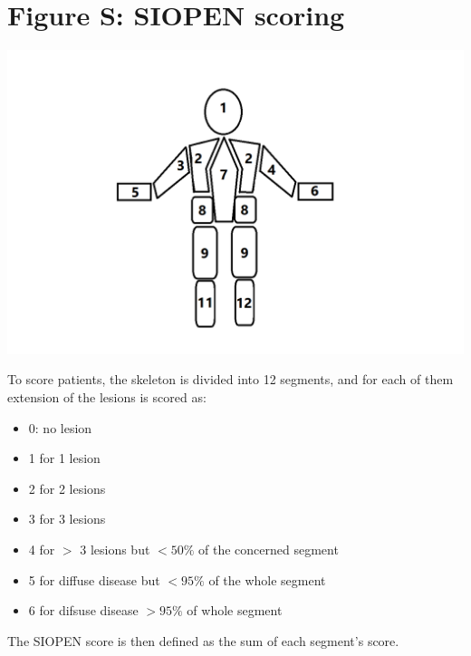 \documentclass[11pt]{article}
\newcounter{fignb}  %
\begin{document}
\section{Figure S: SIOPEN scoring}
\spaceV
\begin{center}
\includegraphics[width=1\textwidth]{figure_S2}
\end{center}
To score patients, the skeleton is divided into 12 segments, and for each of them extension of the lesions is scored as:
\begin{itemize}
\item 0: no lesion
\item 1 for 1 lesion
\item 2 for 2 lesions
\item 3 for 3 lesions
\item 4 for $>$ 3 lesions but $< 50\%$ of the concerned segment
\item 5 for diffuse disease but $<95\%$ of the whole segment
\item 6 for difsuse disease $>95\%$ of  whole segment
\end{itemize}
The SIOPEN score is then defined as the sum of each segment's score.
\newpage
{}
\end{document}
